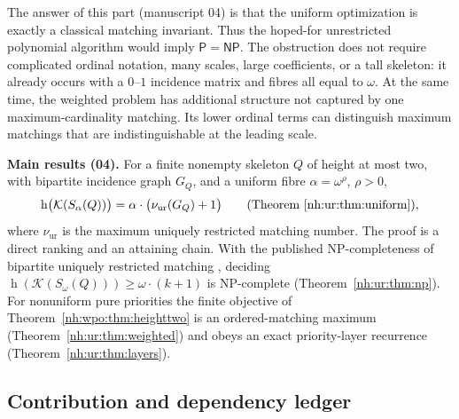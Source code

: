 \documentclass[11pt,a4paper]{article}
\theoremstyle{definition}
\theoremstyle{remark}
\newcommand{\K}{\mathcal K}
\newcommand{\hgt}{\operatorname{h}}
\newcommand{\nuur}{\nu_{\mathrm{ur}}}
\begin{document}
The answer of this part (manuscript 04) is that the uniform optimization is
exactly a classical matching invariant. Thus the hoped-for unrestricted
polynomial algorithm would imply $\mathsf P=\mathsf{NP}$. The obstruction
does not require complicated ordinal notation, many scales, large
coefficients, or a tall skeleton: it already occurs with a $0$--$1$
incidence matrix and fibres all equal to $\omega$. At the same time, the
weighted problem has additional structure not captured by one
maximum-cardinality matching. Its lower ordinal terms can distinguish
maximum matchings that are indistinguishable at the leading scale.

\begin{resultbox}
\small\textbf{Main results (04).} For a finite nonempty skeleton $Q$ of
height at most two, with bipartite incidence graph $G_Q$, and a uniform
fibre $\alpha=\omega^\rho$, $\rho>0$,
\[
 \hgt\bigl(\K(S_\alpha(Q))\bigr)=\alpha\cdot\bigl(\nuur(G_Q)+1\bigr)
 \qquad\text{(Theorem~\ref{nh:ur:thm:uniform})},
\]
where $\nuur$ is the maximum uniquely restricted matching number. The proof
is a direct ranking and an attaining chain. With the published
NP-completeness of bipartite uniquely restricted matching \cite{GHL2001},
deciding $\hgt(\K(S_\omega(Q)))\ge\omega\cdot(k+1)$ is NP-complete
(Theorem~\ref{nh:ur:thm:np}). For nonuniform pure priorities the finite
objective of Theorem~\ref{nh:wpo:thm:heighttwo} is an ordered-matching
maximum (Theorem~\ref{nh:ur:thm:weighted}) and obeys an exact
priority-layer recurrence (Theorem~\ref{nh:ur:thm:layers}).
\end{resultbox}

\subsection{Contribution and dependency ledger}\label{nh:ur:sec:ledger}
\end{document}

